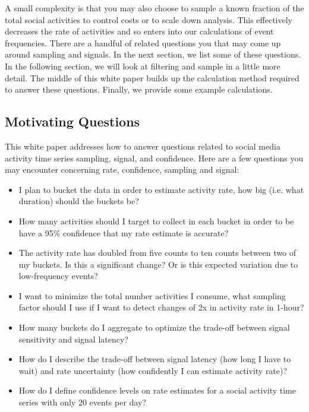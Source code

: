 \documentclass{article}
\begin{document}
A small complexity is that you may also choose to sample a known fraction of the total social activities to control costs or to scale down analysis.  This effectively decreases the rate of activities and so enters into our calculations of event frequencies.  There are a handful of related questions you that may come up around sampling and signals.  In the next section, we list some of these questions. In the following section, we will look at filtering and sample in a little more detail.  The middle of this white paper builds up the calculation method required to answer these questions. Finally, we provide some example calculations.

\subsection{Motivating Questions} 


This white paper addresses how to answer questions related to social media activity time series sampling, signal, and confidence.  Here are a few questions you may encounter concerning rate, confidence, sampling and signal:

\begin{itemize}
\item I plan to bucket the data in order to estimate activity rate, how big (i.e. what duration) should the buckets be? 
\item How many activities should I target to collect in each bucket in order to be have a 95\% confidence that my rate estimate is accurate? 
\item The activity rate has doubled from five counts to ten counts between two of my buckets. Is this a significant change? Or is this expected variation due to low-frequency events?
\item I want to minimize the total number activities I consume, what sampling factor should I use if I want to detect changes of 2x in activity rate in 1-hour?
\item How many buckets do I aggregate to optimize the trade-off between signal sensitivity and signal latency?
\item How do I describe the trade-off between signal latency (how long I have to wait) and rate uncertainty (how confidently I can estimate activity rate)?
\item How do I define confidence levels on rate estimates for a social activity time series with only 20 events per day?
\end{itemize}
\end{document}

